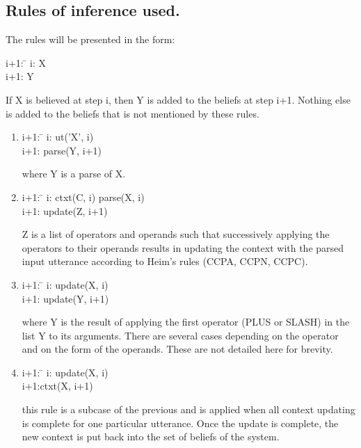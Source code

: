 \documentclass{article}
\begin{document}
\subsection{Rules of inference used.}

The rules will be presented in the form:

\begin{tabbing}
i+1: \= \kill
i:   \> X\\
i+1:\> Y
\end{tabbing}
If X is believed at step i, then Y is added to the beliefs at step
i+1. Nothing else is added to the beliefs that is not mentioned by
these rules.

\begin{enumerate}

\item
\begin{tabbing}
i+1: \= \kill
i:   \> ut('X', i) \\
i+1:\> parse(Y, i+1)
\end{tabbing}
where Y is a parse of X.

\item
\begin{tabbing}
i+1: \= \kill
i:   \> ctxt(C, i) parse(X, i)\\
i+1:\> update(Z, i+1)
\end{tabbing}
Z is a list of operators and operands such that successively applying
the operators to their operands results in updating the context
with the parsed input utterance according to Heim's rules (CCPA, 
CCPN, CCPC). 

\item
\begin{tabbing}
i+1: \= \kill
i:\> update(X, i)\\
i+1:\> update(Y, i+1)
\end{tabbing}
where Y is the result of applying the first operator (PLUS or SLASH)
in the list Y to its arguments. There are several cases depending on
the operator and on the form of the operands. These are not detailed
here for brevity.

\item
\begin{tabbing}
i+1: \= \kill
i:\> update(X, i)\\
i+1:\>ctxt(X, i+1)
\end{tabbing}
this rule is a subcase of the previous and is applied when all context 
updating is complete for one particular utterance. Once the update is 
complete, the new context is put back into the set of beliefs of the 
system.


\end{enumerate}
\end{document}
